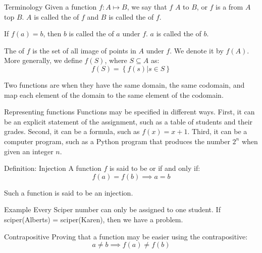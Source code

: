 \documentclass[a4paper]{article}
\begin{document}
\begin{parag}{Terminology}
    Given a function $f: A \mapsto B$, we say that $f$  $A$ to $B$, or $f$ is a  from $A$ top $B$. $A$ is called the  of $f$ and $B$ is called the  of $f$.

    If $f\left(a\right) = b$, then $b$ is called the  of $a$ under $f$. $a$ is called the  of $b$.

    The  of $f$ is the set of all image of points in $A$ under $f$. We denote it by $f\left(A\right)$. More generally, we define $f\left(S\right)$, where $S \subseteq A$ as:
    \[f\left(S\right) = \left\{f\left(s\right) | s \in S\right\}\]

    Two functions are  when they have the same domain, the same codomain, and map each element of the domain to the same element of the codomain.
\end{parag}

\begin{parag}{Representing functions}
    Functions may be specified in different ways. First, it can be an explicit statement of the assignment, such as a table of students and their grades. Second, it can be a formula, such as $f\left(x\right) = x + 1$. Third, it can be a computer program, such as a Python program that produces the number $2^n$ when given an integer $n$.
\end{parag}

\begin{parag}{Definition: Injection}
    A function $f$ is said to be  or  if and only if:
    \[f\left(a\right) = f\left(b\right) \implies a = b\]

    Such a function is said to be an injection.

    \begin{subparag}{Example}
        Every Sciper number can only be assigned to one student. If sciper(Alberts) = sciper(Karen), then we have a problem.
    \end{subparag}

    \begin{subparag}{Contrapositive}
        Proving that a function may be easier using the contrapositive:
        \[a \neq b \implies f\left(a\right) \neq f\left(b\right)\]

    \end{subparag}
\end{parag}
\end{document}
